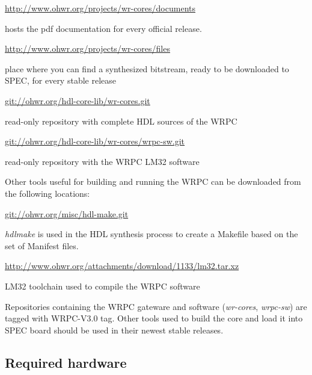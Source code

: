 \documentclass[a4paper, 12pt]{article}
\newcommand{\codeHook}[1]{\mbox{\ttfamily\MakeTextUppercase{#1}}}
\begin{document}
\begin{itemize*}

\item \url{http://www.ohwr.org/projects/wr-cores/documents}

	hosts the pdf documentation for every official release.

\item \url{http://www.ohwr.org/projects/wr-cores/files}

	place where you can find a synthesized bitstream, ready to be downloaded to
  SPEC, for every stable release

\item \url{git://ohwr.org/hdl-core-lib/wr-cores.git}

	read-only repository with complete HDL sources of the \codeHook{WRPC}

\item \url{git://ohwr.org/hdl-core-lib/wr-cores/wrpc-sw.git}

  read-only repository with the \codeHook{WRPC} \codeHook{LM32} software

\end{itemize*}
Other tools useful for building and running the \codeHook{WRPC} can be downloaded from
the following locations:

\begin{itemize*}

\item \url{git://ohwr.org/misc/hdl-make.git}

  \textit{hdlmake} is used in the HDL synthesis process to create a Makefile based
on the set of Manifest files.

\item \url{http://www.ohwr.org/attachments/download/1133/lm32.tar.xz}

  \codeHook{LM32} toolchain used to compile the \codeHook{WRPC} software

\end{itemize*}
Repositories containing the \codeHook{WRPC} gateware and software (\textit{wr-cores},
\textit{wrpc-sw}) are tagged with \codeHook{wrpc-v3.0} tag. Other tools
used to build the core and load it into \codeHook{SPEC} board should be used in their
newest stable releases.


\subsection{Required hardware}
\label{Required hardware}
\end{document}
